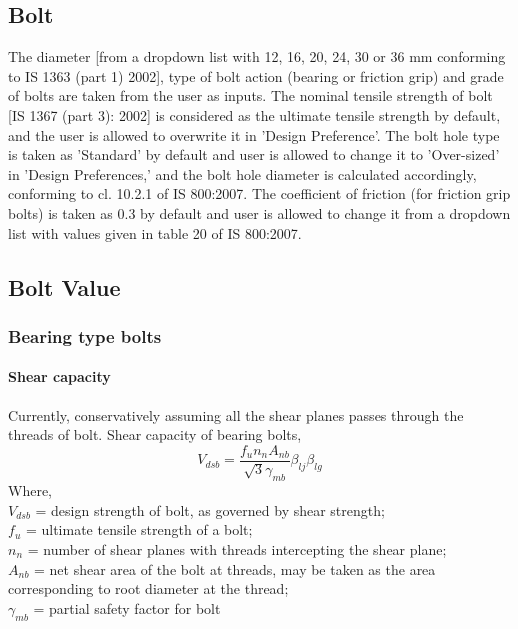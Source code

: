 \documentclass[11.5pt,a4paper,oneside]{report}
\begin{document}
\begin{Form}
\chapter{Bolt}
%
The diameter [from a dropdown list with 12, 16, 20, 24, 30 or 36 mm conforming to IS 1363 (part 1) 2002], type of bolt action (bearing or friction grip) and grade of bolts are taken from the user as inputs. The nominal tensile strength of bolt [IS 1367 (part 3): 2002] is considered as the ultimate tensile strength by default, and the user is allowed to overwrite it in 'Design Preference'. The bolt hole type is taken as 'Standard' by default and user is allowed to change it to 'Over-sized' in 'Design Preferences,' and the bolt hole diameter is calculated accordingly, conforming to cl. 10.2.1 of IS 800:2007. The coefficient of friction (for friction grip bolts) is taken as 0.3 by default and user is allowed to change it from a dropdown list with values given in table 20 of IS 800:2007. 
\section{Bolt Value}
\subsection{Bearing type bolts}
\subsubsection{Shear capacity}
Currently, conservatively assuming all the shear planes passes through the threads of bolt. Shear capacity of bearing bolts,
\begin{equation}
	V_{dsb} = \frac{f_u n_n A_{nb}}{\sqrt{3} \gamma_{mb}} \beta_{lj} \beta_{lg} 
\end{equation}
Where, \\
\indent $V_{dsb}$ = design strength of bolt, as governed by shear strength;\\
\indent $f_u$ = ultimate tensile strength of a bolt;\\
\indent $n_n$ =  number of shear planes with threads intercepting the shear plane; \\
\indent $A_{nb}$ = net shear area of the bolt at threads, may be taken as the area corresponding to root diameter at the thread;\\
\indent $\gamma_{mb}$ = partial safety factor for bolt\\

\end{Form}
\end{document}
